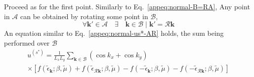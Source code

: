 \begin{enumerate}
	Proceed as for the first point. Similarly to Eq.~\eqref{appeq:normal-B=RA}, Any point in $\mathcal{A}$ can be obtained by rotating some point in $\mathcal{B}$,
	\begin{equation}\label{appeq:normal-A=RB}
		\forall \mathbf{k}' \in \mathcal{A} 
		\quad\exists\quad \mathbf{k} \in \mathcal{B} \mid \mathbf{k}' = \mathcal{R} \mathbf{k}
	\end{equation}
	An equation similar to Eq.~\eqref{appeq:normal-us*-AR} holds, the sum being performed over $\mathcal{B}$
	\begin{multline}
		u^{(s^*)} = \frac{1}{L_x L_y} \sum_{\mathbf{k}\in\mathcal{B}} (\cos k_x + \cos k_y) \\
		\times \left[
		f(\tilde{\epsilon}_\mathbf{k};\beta,\tilde{\mu}) + f(\tilde{\epsilon}_{\mathcal{R}\mathbf{k}};\beta,\tilde{\mu}) - f(-\tilde{\epsilon}_\mathbf{k};\beta,\tilde{\mu}) - f(-\tilde{\epsilon}_{\mathcal{R}\mathbf{k}};\beta,\tilde{\mu})
		\right]
		\label{appeq:normal-us*-BR}
	\end{multline}
	

\end{enumerate}
